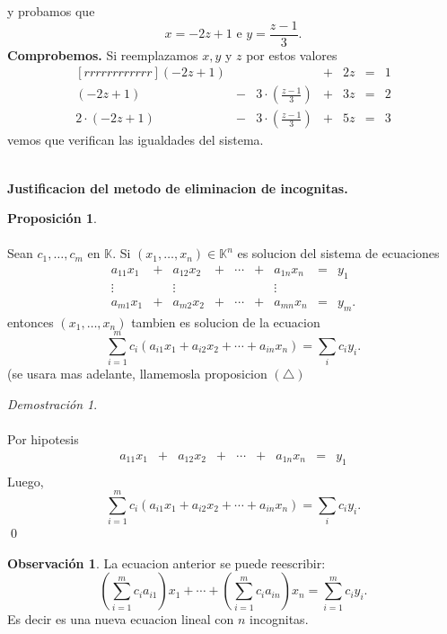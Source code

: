 \documentclass{article}
\theoremstyle{definition}
\theoremstyle{definition}
\newtheorem*{obs}{Observación}
\newtheorem{prop}[teo]{Proposición}
\theoremstyle{remark}
\newtheorem*{demo}{Demostración}
\begin{document}
y probamos que \[
  x=-2z+1 \text{ e } y=\frac{z-1}{3}.
\]
\textbf{Comprobemos.} Si reemplazamos $x,y$ y $z$ por estos valores \[
\begin{matrix}[rrrrrrrrrrrr]
  (-2z+1)  &   &    & + & 2z & = & 1  \\
  (-2z+1)  & - & 3\cdot(\frac{z-1}{3}) & + & 3z & = & 2 \\
  2\cdot(-2z+1) & - & 3\cdot(\frac{z-1}{3}) & + & 5z & = & 3
  \end{matrix}
\]
vemos que verifican las igualdades del sistema.\\\\
\begin{center}
\textbf{Justificacion del metodo de eliminacion de incognitas.}
\end{center}

\begin{prop}\;\\\\
  Sean $c_1,\dots, c_m$ en $\mathbb{K}$. Si $(x_1,\dots,x_n) \in \mathbb{K}^n$ es solucion del sistema de ecuaciones \[
    \begin{matrix}
      a_{11}x_{1} & + & a_{12}x_{2}& + & \cdots & + & a_{1n}x_{n} & = & y_1 \\
      \vdots & & \vdots && &&\vdots \\
      a_{m1}x_{1} & + & a_{m2}x_{2} & + & \cdots & + & a_{mn}x_{n} & = & y_{m}.
    \end{matrix}
  \]
  entonces $(x_1,\dots,x_n)$ tambien es solucion de la ecuacion \[
    \sum_{i=1}^{m}{c_i}(a_{i1}x_1+a_{i2}x_2+\cdots+a_{in}x_n)=\sum_{i}c_iy_i.
  \]
  (se usara mas adelante, llamemosla proposicion $(\triangle)$
\end{prop}
\begin{demo}\;\\\\
  Por hipotesis \[
      \begin{matrix}
      a_{11}x_{1} & + & a_{12}x_{2}& + & \cdots & + & a_{1n}x_{n} & = & y_1 \\
         \end{matrix}
  \]
  Luego,\[
 \sum_{i=1}^{m}{c_i}(a_{i1}x_1+a_{i2}x_2+\cdots+a_{in}x_n)=\sum_{i}c_iy_i.
\]
  \qed
\end{demo}
\begin{obs}
La ecuacion anterior se puede reescribir: \[
  \left(\sum_{i=1}^{m}{c_ia_{i1}}\right)x_1+ \cdots +\left(\sum_{i=1}^{m}{c_ia_{in}}\right)x_n=\sum_{i=1}^{m}{c_iy_i}.
\]Es decir es una nueva ecuacion lineal con $n$ incognitas.
\end{obs}
\end{document}
